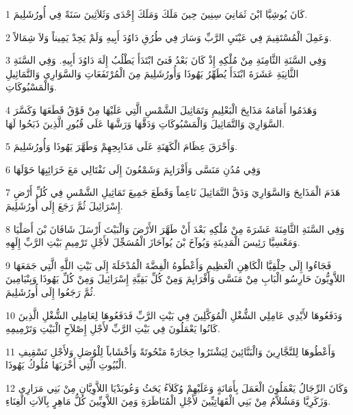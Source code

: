 \par 1 كَانَ يُوشِيَّا ابْنَ ثَمَانِيَ سِنِينَ حِينَ مَلَكَ وَمَلَكَ إِحْدَى وَثَلاَثِينَ سَنَةً فِي أُورُشَلِيمَ.
\par 2 وَعَمِلَ الْمُسْتَقِيمَ فِي عَيْنَيِ الرَّبِّ وَسَارَ فِي طُرُقِ دَاوُدَ أَبِيهِ وَلَمْ يَحِدْ يَمِيناً وَلاَ شِمَالاً.
\par 3 وَفِي السَّنَةِ الثَّامِنَةِ مِنْ مُلْكِهِ إِذْ كَانَ بَعْدُ فَتىً ابْتَدَأَ يَطْلُبُ إِلَهَ دَاوُدَ أَبِيهِ. وَفِي السَّنَةِ الثَّانِيَةِ عَشَرَةَ ابْتَدَأَ يُطَهِّرُ يَهُوذَا وَأُورُشَلِيمَ مِنَ الْمُرْتَفَعَاتِ وَالسَّوَارِي وَالتَّمَاثِيلِ وَالْمَسْبُوكَاتِ.
\par 4 وَهَدَمُوا أَمَامَهُ مَذَابِحَ الْبَعْلِيمِ وَتَمَاثِيلَ الشَّمْسِ الَّتِي عَلَيْهَا مِنْ فَوْقُ قَطَعَهَا وَكَسَّرَ السَّوَارِيَ وَالتَّمَاثِيلَ وَالْمَسْبُوكَاتِ وَدَقَّهَا وَرَشَّهَا عَلَى قُبُورِ الَّذِينَ ذَبَحُوا لَهَا.
\par 5 وَأَحْرَقَ عِظَامَ الْكَهَنَةِ عَلَى مَذَابِحِهِمْ وَطَهَّرَ يَهُوذَا وَأُورُشَلِيمَ.
\par 6 وَفِي مُدُنِ مَنَسَّى وَأَفْرَايِمَ وَشَمْعُونَ إِلَى نَفْتَالِي مَعَ خَرَائِبِهَا حَوْلَهَا
\par 7 هَدَمَ الْمَذَابِحَ وَالسَّوَارِيَ وَدَقَّ التَّمَاثِيلَ نَاعِماً وَقَطَعَ جَمِيعَ تَمَاثِيلِ الشَّمْسِ فِي كُلِّ أَرْضِ إِسْرَائِيلَ ثُمَّ رَجَعَ إِلَى أُورُشَلِيمَ.
\par 8 وَفِي السَّنَةِ الثَّامِنَةَ عَشَرَةَ مِنْ مُلْكِهِ بَعْدَ أَنْ طَهَّرَ الأَرْضَ وَالْبَيْتَ أَرْسَلَ شَافَانَ بْنَ أَصَلْيَا وَمَعْسِيَّا رَئِيسَ الْمَدِينَةِ وَيُوآخَ بْنَ يُوآحَازَ الْمُسَجِّلَ لأَجْلِ تَرْمِيمِ بَيْتِ الرَّبِّ إِلَهِهِ.
\par 9 فَجَاءُوا إِلَى حِلْقِيَّا الْكَاهِنِ الْعَظِيمِ وَأَعْطُوهُ الْفِضَّةَ الْمُدْخَلَةَ إِلَى بَيْتِ اللَّهِ الَّتِي جَمَعَهَا اللاَّوِيُّونَ حَارِسُو الْبَابِ مِنْ مَنَسَّى وَأَفْرَايِمَ وَمِنْ كُلِّ بَقِيَّةِ إِسْرَائِيلَ وَمِنْ كُلِّ يَهُوذَا وَبِنْيَامِينَ ثُمَّ رَجَعُوا إِلَى أُورُشَلِيمَ.
\par 10 وَدَفَعُوهَا لأَيْدِي عَامِلِي الشُّغْلِ الْمُوَكَّلِينَ فِي بَيْتِ الرَّبِّ فَدَفَعُوهَا لِعَامِلِي الشُّغْلِ الَّذِينَ كَانُوا يَعْمَلُونَ فِي بَيْتِ الرَّبِّ لأَجْلِ إِصْلاَحِ الْبَيْتِ وَتَرْمِيمِهِ.
\par 11 وَأَعْطُوهَا لِلنَّجَّارِينَ وَالْبَنَّائِينَ لِيَشْتَرُوا حِجَارَةً مَنْحُوتَةً وَأَخْشَاباً لِلْوُصَلِ وَلأَجْلِ تَسْقِيفِ الْبُيُوتِ الَّتِي أَخْرَبَهَا مُلُوكُ يَهُوذَا.
\par 12 وَكَانَ الرِّجَالُ يَعْمَلُونَ الْعَمَلَ بِأَمَانَةٍ وَعَلَيْهِمْ وُكَلاَءُ يَحَثُ وَعُوبَدْيَا اللاَّوِيَّانِ مِنْ بَنِي مَرَارِي وَزَكَرِيَّا وَمَشُلاَّمُ مِنْ بَنِي الْقَهَاتِيِّينَ لأَجْلِ الْمُنَاظَرَةِ وَمِنَ اللاَّوِيِّينَ كُلُّ مَاهِرٍ بِآلاَتِ الْغِنَاءِ.
